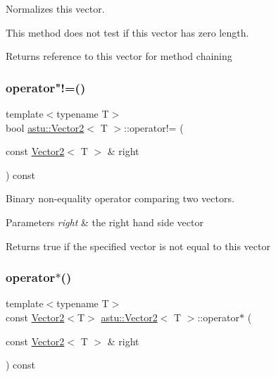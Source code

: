 Normalizes this vector.

This method does not test if this vector has zero length.

\begin{DoxyReturn}{Returns}
reference to this vector for method chaining 
\end{DoxyReturn}
\mbox{\label{classastu_1_1Vector2_a01b57021e1b027997ecefb3c9b3595d9}} 
\subsubsection{\texorpdfstring{operator"!=()}{operator!=()}}
{\footnotesize\ttfamily template$<$typename T$>$ \\
bool \hyperlink{classastu_1_1Vector2}{astu\+::\+Vector2}$<$ T $>$\+::operator!= (\begin{DoxyParamCaption}\item[{const \hyperlink{classastu_1_1Vector2}{Vector2}$<$ T $>$ \&}]{right }\end{DoxyParamCaption}) const\hspace{0.3cm}{\ttfamily [inline]}}

Binary non-\/equality operator comparing two vectors.


\begin{DoxyParams}{Parameters}
{\em right} & the right hand side vector \\
\hline
\end{DoxyParams}
\begin{DoxyReturn}{Returns}
{\ttfamily true} if the specified vector is not equal to this vector 
\end{DoxyReturn}
\mbox{\label{classastu_1_1Vector2_a5ee8479488e6da2a82110f2ac62d386f}} 
\subsubsection{\texorpdfstring{operator$\ast$()}{operator*()}\hspace{0.1cm}{\footnotesize\ttfamily [1/2]}}
{\footnotesize\ttfamily template$<$typename T$>$ \\
const \hyperlink{classastu_1_1Vector2}{Vector2}$<$T$>$ \hyperlink{classastu_1_1Vector2}{astu\+::\+Vector2}$<$ T $>$\+::operator$\ast$ (\begin{DoxyParamCaption}\item[{const \hyperlink{classastu_1_1Vector2}{Vector2}$<$ T $>$ \&}]{right }\end{DoxyParamCaption}) const\hspace{0.3cm}{\ttfamily [inline]}}

